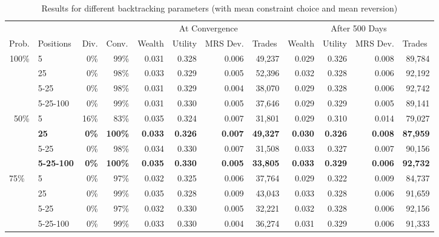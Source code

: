 \documentclass[12pt,a4paper,titlepage]{article}
\newcommand{\co}[1]{\textsf{#1}}
\begin{document}
\begin{sidewaystable}
  \begin{tabular}{rl|rr|rrrr|rrrr}

    \multicolumn{1}{l}{} &  & \multicolumn{1}{l}{} & \multicolumn{1}{l}{} & \multicolumn{ 4}{|c|}{At Convergence} & \multicolumn{ 4}{c}{After 500 Days} \\ 
    \multicolumn{1}{l}{Prob.} & Positions & \multicolumn{1}{l}{Div.} & \multicolumn{1}{l|}{Conv.} & \multicolumn{1}{l}{Wealth} & \multicolumn{1}{l}{Utility} & \multicolumn{1}{l}{MRS Dev.} & \multicolumn{1}{l|}{Trades} & \multicolumn{1}{l}{Wealth} & \multicolumn{1}{l}{Utility} & \multicolumn{1}{l}{MRS Dev.} & \multicolumn{1}{l}{Trades} \\ 
    \hline
    \multicolumn{ 1}{r}{100\%} & 5 & 0\% & 99\% & 0.031 & 0.328 & 0.006 & 49,237 & 0.029 & 0.326 & 0.008 & 89,784 \\ 
    \multicolumn{ 1}{r}{} & 25 & 0\% & 98\% & 0.033 & 0.329 & 0.005 & 52,396 & 0.032 & 0.328 & 0.006 & 92,192 \\ 
    \multicolumn{ 1}{r}{} & 5-25 & 0\% & 98\% & 0.031 & 0.329 & 0.004 & 38,070 & 0.029 & 0.328 & 0.006 & 92,742 \\ 
    \multicolumn{ 1}{r}{} & 5-25-100 & 0\% & 99\% & 0.031 & 0.330 & 0.005 & 37,646 & 0.029 & 0.329 & 0.005 & 89,141 \\ 
    \multicolumn{ 1}{r}{50\%} & 5 & 16\% & 83\% & 0.035 & 0.324 & 0.007 & 31,801 & 0.029 & 0.310 & 0.014 & 79,027 \\ 
    \multicolumn{ 1}{r}{} & \textbf{25} & \textbf{0\%} & \textbf{100\%} & \textbf{0.033} & \textbf{0.326} & \textbf{0.007} & \textbf{49,327} & \textbf{0.030} & \textbf{0.326} & \textbf{0.008} & \textbf{87,959} \\ 
    \multicolumn{ 1}{r}{} & 5-25 & 0\% & 98\% & 0.034 & 0.330 & 0.007 & 31,508 & 0.033 & 0.327 & 0.007 & 90,156 \\ 
    \multicolumn{ 1}{r}{} & \textbf{5-25-100} & \textbf{0\%} & \textbf{100\%} & \textbf{0.035} & \textbf{0.330} & \textbf{0.005} & \textbf{33,805} & \textbf{0.033} & \textbf{0.329} & \textbf{0.006} & \textbf{92,732} \\ 
    \multicolumn{ 1}{l}{75\%} & 5 & 0\% & 97\% & 0.032 & 0.325 & 0.006 & 37,764 & 0.029 & 0.322 & 0.009 & 84,737 \\ 
    \multicolumn{ 1}{r}{} & 25 & 0\% & 99\% & 0.035 & 0.328 & 0.009 & 43,043 & 0.033 & 0.328 & 0.006 & 91,659 \\ 
    \multicolumn{ 1}{l}{} & 5-25 & 0\% & 97\% & 0.032 & 0.330 & 0.005 & 32,221 & 0.032 & 0.328 & 0.006 & 92,156 \\ 
    \multicolumn{ 1}{l}{} & 5-25-100 & 0\% & 99\% & 0.033 & 0.330 & 0.004 & 36,274 & 0.031 & 0.329 & 0.006 & 91,333 \\ 
  \end{tabular}
  \caption{Results for different backtracking parameters (with \co{mean} constraint choice and \co{mean} reversion)}
  \label{tab:bt2}
\end{sidewaystable}
\end{document}
